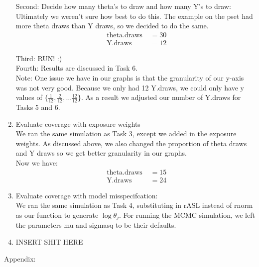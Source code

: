 \documentclass[paper=a4, fontsize=11pt]{scrartcl}
\begin{document}
\begin{enumerate}
      Second: Decide how many theta's to draw and how many Y's to draw: \\
        Ultimately we weren't sure how best to do this. The example on the pset had more theta draws than Y draws, so we decided to do the same.
        \begin{align*}
          \text{ theta.draws } &= 30 \\
          \text{ Y.draws } &= 12
        \end{align*}

      Third: RUN! :) \\

      Fourth: Results are discussed in Task 6. \\

      Note: One issue we have in our graphs is that the granularity of our y-axis was not very good. Because we only had 12 Y.draws, we could only have y values of $\{\frac{1}{12}, \frac{2}{12}, \ldots \frac{12}{12}\}$. As a result we adjusted our number of Y.draws for Tasks 5 and 6.
    \item Evaluate coverage with exposure weights \\

      We ran the same simulation as Task 3, except we added in the exposure weights. As discussed above, we also changed the proportion of theta draws and Y draws so we get better granularity in our graphs. \\
      Now we have:
      \begin{align*}
          \text{ theta.draws } &= 15 \\
          \text{ Y.draws } &= 24
      \end{align*}
    \item Evaluate coverage with model misspecifcation: \\

      We ran the same simulation as Task 4, substituting in rASL instead of rnorm as our function to generate $\log{\theta_j}$. For running the MCMC simulation, we left the parameters mu and sigmasq to be their defaults.
    \item INSERT SHIT HERE
  \end{enumerate}
Appendix: \\
\end{document}
